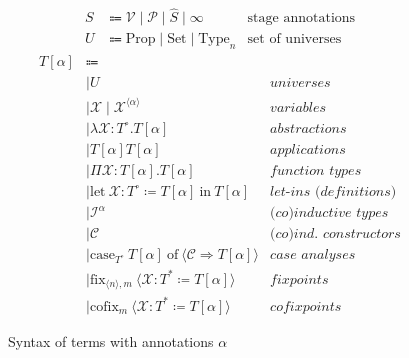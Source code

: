 \begin{figure}
\centering
\begin{align*}
S &\Coloneqq \mathcal{V} \mid \mathcal{P} \mid \widehat{S} \mid \infty &\text{stage annotations} \\
U &\Coloneqq \text{Prop} \mid \text{Set} \mid \text{Type}_n &\text{set of universes}
\end{align*}
\begin{align*}
T[\alpha] &\Coloneqq \\
    &\mid U
        &\textit{universes}\\
    &\mid \mathcal{X} \mid \mathcal{X}^{\langle \alpha \rangle}
        &\textit{variables} \\
    &\mid \lambda \mathcal{X}: T^\circ. T[\alpha]
        &\textit{abstractions} \\
    &\mid T[\alpha] T[\alpha]
        &\textit{applications} \\
    &\mid \Pi \mathcal{X}: T[\alpha]. T[\alpha]
        &\textit{function types} \\
    &\mid \text{let}\ \mathcal{X} : T^\circ \coloneqq T[\alpha] \ \text{in}\ T[\alpha]
        &\textit{let-ins (definitions)} \\
    &\mid \mathcal{I}^\alpha
        &\textit{(co)inductive types} \\
    &\mid \mathcal{C}
        &\textit{(co)ind. constructors} \\
    &\mid \text{case}_{T^\circ} \ T[\alpha] \ \text{of} \ \langle \mathcal{C} \Rightarrow T[\alpha] \rangle
        &\textit{case analyses} \\
    &\mid \text{fix}_{\langle n \rangle, m} \ \langle \mathcal{X}: T^* \coloneqq T[\alpha] \rangle
        &\textit{fixpoints} \\
    &\mid \text{cofix}_{m} \ \langle \mathcal{X}: T^* \coloneqq T[\alpha] \rangle
        &\textit{cofixpoints}
\end{align*}
\caption{Syntax of \lang terms with annotations $\alpha$}
\label{fig:terms-general}
\end{figure}